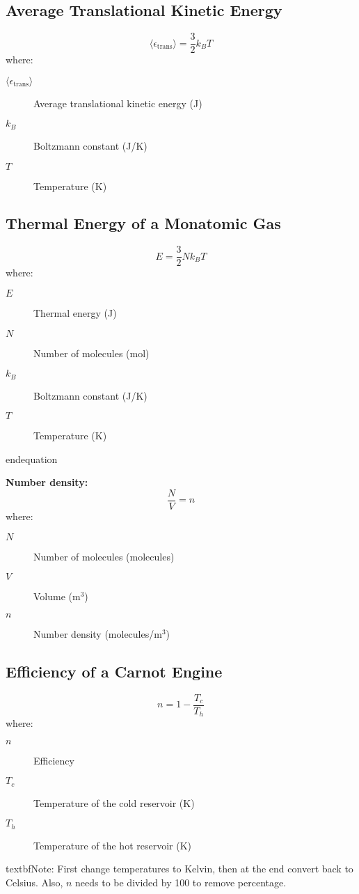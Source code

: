 \documentclass{article}
\begin{document}
\subsection*{Average Translational Kinetic Energy}
\begin{equation}
\langle \epsilon_{\text{trans}} \rangle = \frac{3}{2} k_B T
\end{equation}
where:
\begin{description}
    \item[$\langle \epsilon_{\text{trans}} \rangle$] Average translational kinetic energy (J)
    \item[$k_B$] Boltzmann constant (J/K)
    \item[$T$] Temperature (K)
\end{description}

\subsection*{Thermal Energy of a Monatomic Gas}
\begin{equation}
E = \frac{3}{2} Nk_B T
\end{equation}
where:
\begin{description}
    \item[$E$] Thermal energy (J)
    \item[$N$] Number of molecules (mol)
    \item[$k_B$] Boltzmann constant (J/K)
    \item[$T$] Temperature (K)
\end{description}
end{equation}

\textbf{Number density:}
\begin{equation}
\frac{N}{V} = n
\end{equation}
where:
\begin{description}
    \item[$N$] Number of molecules (molecules)
    \item[$V$] Volume (m\(^3\))
    \item[$n$] Number density (molecules/m\(^3\))
\end{description}

\subsection*{Efficiency of a Carnot Engine}
\begin{equation}
n = 1 - \frac{T_c}{T_h}
\end{equation}
where:
\begin{description}
    \item[$n$] Efficiency
    \item[$T_c$] Temperature of the cold reservoir (K)
    \item[$T_h$] Temperature of the hot reservoir (K)
\end{description}
textbf{Note:} First change temperatures to Kelvin, then at the end convert back to Celsius. Also, \( n \) needs to be divided by 100 to remove percentage.
\end{document}
